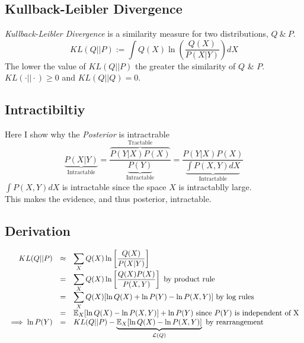 \documentclass[11pt,a4paper]{article}
\begin{document}
\subsection{Kullback-Leibler Divergence}
\textit{Kullback-Leibler Divergence} is a similarity measure for two distributions, $Q\ \&\ P$.
$$KL(Q||P):=\int Q(X)\ln\left(\frac{Q(X)}{P(X|Y)}\right)dX$$
The lower the value of $KL(Q||P)$ the greater the similarity of $Q$ \& $P$.\\
\nb $KL(\cdot||\cdot)\geq 0$ and $KL(Q||Q)=0$.

\subsection{Intractibiltiy}
Here I show why the \textit{Posterior} is intractrable
$$\underbrace{P(X|Y)}_\text{Intractable}=\frac{\overbrace{P(Y|X)P(X)}^\text{Tractable}}{\underbrace{P(Y)}_\text{Intractable}}=\frac{P(Y|X)P(X)}{\underbrace{\int P(X,Y)dX}_\text{Intractable}}$$
$\int P(X,Y)dX$ is intractable since the space $X$ is intractablly large.\\
This makes the evidence, and thus posterior, intractable.

\subsection{Derivation}
\[\begin{array}{rcl}
KL(Q||P)&\approx&\displaystyle\sum_X Q(X)\ln\left[\dfrac{Q(X)}{P(X|Y)}\right]\\
&=&\displaystyle\sum_X Q(X)\ln\left[\dfrac{Q(X)P(X)}{P(X,Y)}\right]\text{ by product rule}\\
&=&\displaystyle\sum_XQ(X)[\ln Q(X)+\ln P(Y)-\ln P(X,Y)]\text{ by log rules}\\
&=&\mathbb{E}_X[\ln Q(X)-\ln P(X,Y)]+\ln P(Y)\text{ since }P(Y)\text{ is independent of X}\\
\implies\ln P(Y)&=&KL(Q||P)-\underbrace{\mathbb{E}_X[\ln Q(X)-\ln P(X,Y)]}_{\mathcal{L}(Q)}\text{ by rearrangement}
\end{array}\]
\end{document}
